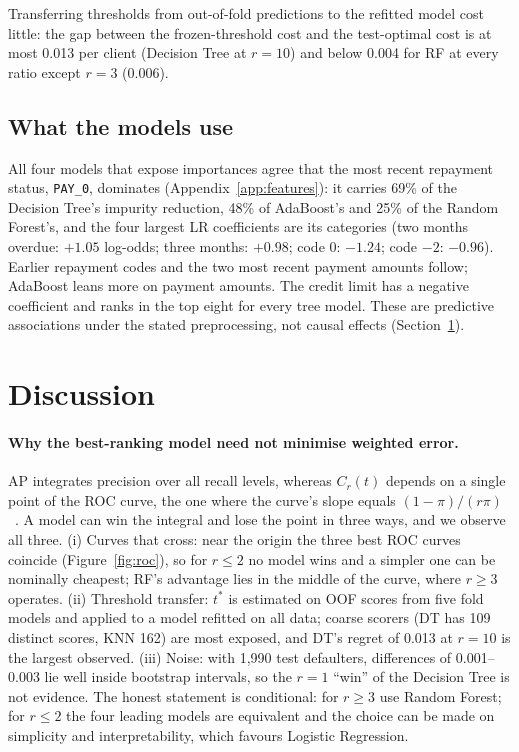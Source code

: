 \documentclass{article}
\begin{document}
Transferring thresholds from out-of-fold predictions to the refitted model cost little: the gap between the frozen-threshold cost and the test-optimal cost is at most 0.013 per client (Decision Tree at $r=10$) and below 0.004 for RF at every ratio except $r=3$ (0.006).

\subsection{What the models use}
All four models that expose importances agree that the most recent repayment status, \texttt{PAY\_0}, dominates (Appendix~\ref{app:features}): it carries 69\% of the Decision Tree's impurity reduction, 48\% of AdaBoost's and 25\% of the Random Forest's, and the four largest LR coefficients are its categories (two months overdue: $+1.05$ log-odds; three months: $+0.98$; code 0: $-1.24$; code $-2$: $-0.96$). Earlier repayment codes and the two most recent payment amounts follow; AdaBoost leans more on payment amounts. The credit limit has a negative coefficient and ranks in the top eight for every tree model. These are predictive associations under the stated preprocessing, not causal effects (Section~\ref{sec:discussion}).

\section{Discussion}
\label{sec:discussion}
\paragraph{Why the best-ranking model need not minimise weighted error.} AP integrates precision over all recall levels, whereas $C_r(t)$ depends on a single point of the ROC curve, the one where the curve's slope equals $(1-\pi)/(r\pi)$~\citep{provost2001robust}. A model can win the integral and lose the point in three ways, and we observe all three. (i) Curves that cross: near the origin the three best ROC curves coincide (Figure~\ref{fig:roc}), so for $r\le2$ no model wins and a simpler one can be nominally cheapest; RF's advantage lies in the middle of the curve, where $r\ge3$ operates. (ii) Threshold transfer: $t^\ast$ is estimated on OOF scores from five fold models and applied to a model refitted on all data; coarse scorers (DT has 109 distinct scores, KNN 162) are most exposed, and DT's regret of 0.013 at $r=10$ is the largest observed. (iii) Noise: with 1{,}990 test defaulters, differences of 0.001--0.003 lie well inside bootstrap intervals, so the $r=1$ ``win'' of the Decision Tree is not evidence. The honest statement is conditional: for $r\ge3$ use Random Forest; for $r\le2$ the four leading models are equivalent and the choice can be made on simplicity and interpretability, which favours Logistic Regression.
\end{document}
